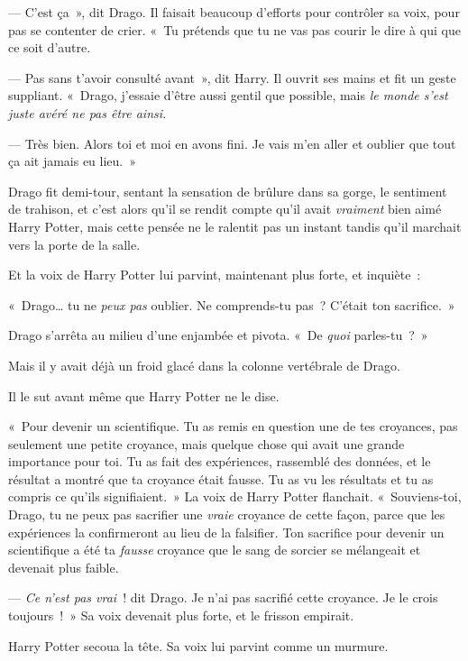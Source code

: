 --- C'est ça~», dit Drago. Il faisait beaucoup d'efforts pour contrôler sa voix, pour pas se contenter de crier. «~Tu prétends que tu ne vas pas courir le dire à qui que ce soit d'autre.

--- Pas sans t'avoir consulté avant~», dit Harry. Il ouvrit ses mains et fit un geste suppliant. «~Drago, j'essaie d'être aussi gentil que possible, mais \emph{le monde s'est juste avéré ne pas être ainsi.}

--- Très bien. Alors toi et moi en avons fini. Je vais m'en aller et oublier que tout ça ait jamais eu lieu.~»

Drago fit demi-tour, sentant la sensation de brûlure dans sa gorge, le sentiment de trahison, et c'est alors qu'il se rendit compte qu'il avait \emph{vraiment} bien aimé Harry Potter, mais cette pensée ne le ralentit pas un instant tandis qu'il marchait vers la porte de la salle.

Et la voix de Harry Potter lui parvint, maintenant plus forte, et inquiète~:

«~Drago… tu ne \emph{peux pas} oublier. Ne comprends-tu pas~? C'était ton sacrifice.~»

Drago s'arrêta au milieu d'une enjambée et pivota. «~De \emph{quoi} parles-tu~?~»

Mais il y avait déjà un froid glacé dans la colonne vertébrale de Drago.

Il le sut avant même que Harry Potter ne le dise.

«~Pour devenir un scientifique. Tu as remis en question une de tes croyances, pas seulement une petite croyance, mais quelque chose qui avait une grande importance pour toi. Tu as fait des expériences, rassemblé des données, et le résultat a montré que ta croyance était fausse. Tu as vu les résultats et tu as compris ce qu'ils signifiaient.~» La voix de Harry Potter flanchait. «~Souviens-toi, Drago, tu ne peux pas sacrifier une \emph{vraie} croyance de cette façon, parce que les expériences la confirmeront au lieu de la falsifier. Ton sacrifice pour devenir un scientifique a été ta \emph{fausse} croyance que le sang de sorcier se mélangeait et devenait plus faible.

--- \emph{Ce n'est pas vrai}~! dit Drago. Je n'ai pas sacrifié cette croyance. Je le crois toujours~!~» Sa voix devenait plus forte, et le frisson empirait.

Harry Potter secoua la tête. Sa voix lui parvint comme un murmure.

